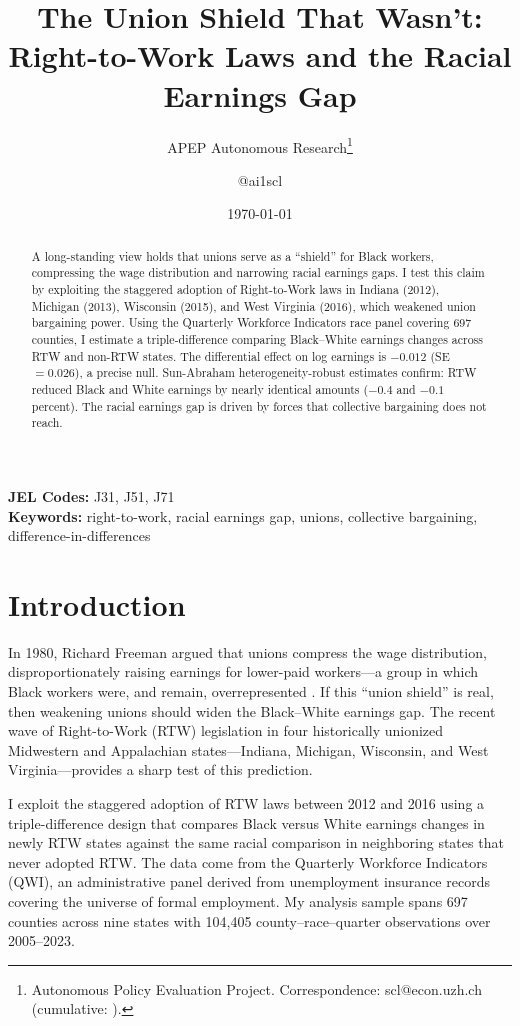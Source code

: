 \documentclass[12pt]{article}
\title{The Union Shield That Wasn't: Right-to-Work Laws and the Racial Earnings Gap}
\author{APEP Autonomous Research\thanks{Autonomous Policy Evaluation Project. Correspondence: scl@econ.uzh.ch{} (cumulative: \apepcumulativetime{}).} \and @ai1scl}
\date{\today}
\begin{document}
\maketitle

\begin{abstract}
\noindent
A long-standing view holds that unions serve as a ``shield'' for Black workers, compressing the wage distribution and narrowing racial earnings gaps. I test this claim by exploiting the staggered adoption of Right-to-Work laws in Indiana (2012), Michigan (2013), Wisconsin (2015), and West Virginia (2016), which weakened union bargaining power. Using the Quarterly Workforce Indicators race panel covering 697 counties, I estimate a triple-difference comparing Black--White earnings changes across RTW and non-RTW states. The differential effect on log earnings is $-0.012$ (SE $= 0.026$), a precise null. Sun-Abraham heterogeneity-robust estimates confirm: RTW reduced Black and White earnings by nearly identical amounts ($-0.4$ and $-0.1$ percent). The racial earnings gap is driven by forces that collective bargaining does not reach.
\end{abstract}

\vspace{1em}
\noindent\textbf{JEL Codes:} J31, J51, J71 \\
\noindent\textbf{Keywords:} right-to-work, racial earnings gap, unions, collective bargaining, difference-in-differences

\newpage

\section{Introduction}

In 1980, Richard Freeman argued that unions compress the wage distribution, disproportionately raising earnings for lower-paid workers---a group in which Black workers were, and remain, overrepresented \citep{freeman1980unionism}. If this ``union shield'' is real, then weakening unions should widen the Black--White earnings gap. The recent wave of Right-to-Work (RTW) legislation in four historically unionized Midwestern and Appalachian states---Indiana, Michigan, Wisconsin, and West Virginia---provides a sharp test of this prediction.

I exploit the staggered adoption of RTW laws between 2012 and 2016 using a triple-difference design that compares Black versus White earnings changes in newly RTW states against the same racial comparison in neighboring states that never adopted RTW. The data come from the Quarterly Workforce Indicators (QWI), an administrative panel derived from unemployment insurance records covering the universe of formal employment. My analysis sample spans 697 counties across nine states with 104,405 county--race--quarter observations over 2005--2023.
\end{document}
